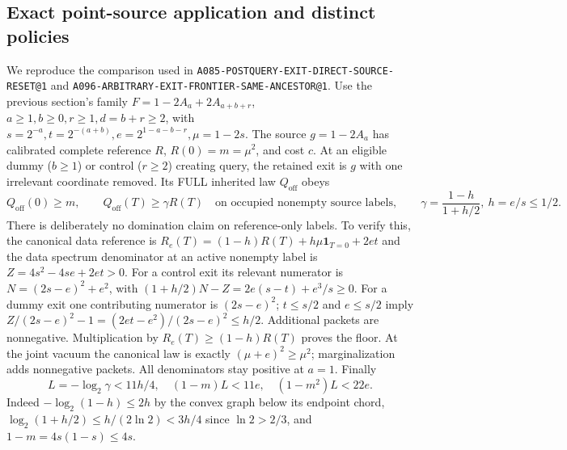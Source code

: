 \documentclass[11pt]{article}
\begin{document}
\subsection{Exact point-source application and distinct policies}
\label{sec:exitfloor8}
We reproduce the comparison used in
\texttt{A085-POSTQUERY-EXIT-DIRECT-SOURCE-RESET@1} and
\texttt{A096-ARBITRARY-EXIT-FRONTIER-SAME-ANCESTOR@1}.
Use the previous section's family
$F=1-2A_a+2A_{a+b+r}$, $a\ge1,b\ge0,r\ge1,d=b+r\ge2$,
with $s=2^{-a},t=2^{-(a+b)},e=2^{1-a-b-r},\mu=1-2s$.
The source $g=1-2A_a$ has calibrated complete reference $R$,
$R(0)=m=\mu^2$, and cost $c$.
At an eligible dummy ($b\ge1$) or control ($r\ge2$) creating query,
the retained exit is $g$ with one irrelevant coordinate removed.
Its FULL inherited law $Q_{\mathrm{off}}$ obeys
\[
Q_{\mathrm{off}}(0)\ge m,\qquad
Q_{\mathrm{off}}(T)\ge\gamma R(T)
\quad\text{on occupied nonempty source labels},\qquad
\gamma=\frac{1-h}{1+h/2},\ h=e/s\le1/2.
\]
There is deliberately no domination claim on reference-only labels.
To verify this, the canonical data reference is
$R_e(T)=(1-h)R(T)+h\mu\mathbf1_{T=0}+2et$ and the data spectrum
denominator at an active nonempty label is
$Z=4s^2-4se+2et>0$. For a control exit its relevant numerator is
$N=(2s-e)^2+e^2$, with
$(1+h/2)N-Z=2e(s-t)+e^3/s\ge0$.
For a dummy exit one contributing numerator is $(2s-e)^2$;
$t\le s/2$ and $e\le s/2$ imply
$Z/(2s-e)^2-1=(2et-e^2)/(2s-e)^2\le h/2$.
Additional packets are nonnegative. Multiplication by
$R_e(T)\ge(1-h)R(T)$ proves the floor. At the joint vacuum the
canonical law is exactly $(\mu+e)^2\ge\mu^2$; marginalization adds
nonnegative packets. All denominators stay positive at $a=1$.
Finally
\[
L=-\log_2\gamma<11h/4,\quad
(1-m)L<11e,\quad (1-m^2)L<22e.
\]
Indeed $-\log_2(1-h)\le2h$ by the convex graph below its endpoint
chord, $\log_2(1+h/2)\le h/(2\ln2)<3h/4$ since $\ln2>2/3$,
and $1-m=4s(1-s)\le4s$.
\end{document}
